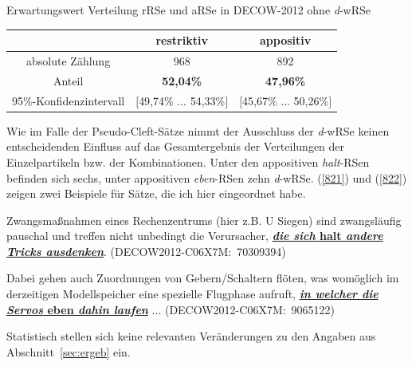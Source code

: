 \begin{exe}
	\ex\label{820}Erwartungswert Verteilung rRSe und aRSe in DECOW-2012 ohne \textit{d}-wRSe\\[-1em]		
 		\begin{tabular}[t]{|c|c|c|} 
 		\hline 	
   	 	& \textbf{restriktiv} & \textbf{appositiv} \\
   	 	\hline 
  		absolute Zählung & 968 & 892\\ 
   		\hline
   		Anteil & \textbf{52,04\%} & \textbf{47,96\%}\\
   		\hline
   		95\%-Konfidenzintervall & $[$49,74\% ... 54,33\%$]$ & $[$45,67\% ... 50,26\%$]$ \\
   		\hline
 		\end{tabular}
\end{exe}
Wie im Falle der Pseudo-Cleft-Sätze nimmt der Ausschluss der \textit{d}-wRSe keinen entscheidenden Einfluss auf das Gesamtergebnis der Verteilungen der Einzelpartikeln bzw. der Kombinationen. Unter den appositiven \textit{halt}-RSen befinden sich sechs, unter appositiven \textit{eben}-RSen zehn \textit{d}-wRSe. (\ref{821}) und (\ref{822}) zeigen zwei Beispiele für Sätze, die ich hier eingeordnet habe.

\begin{exe}
	\ex\label{821} 
	\scriptsize
	Zwangsmaßnahmen eines Rechenzentrums (hier z.B. U Siegen) sind zwangsläufig pauschal und tref\-fen nicht unbedingt die Verursacher, \underline{\textbf{\textit{die sich} halt \textit{andere Tricks ausdenken}}}.                                        
	\newline
	\hbox{}\hfill\hbox{(DECOW2012-C06X7M: 70309394)}
\end{exe} 	

 \begin{exe}
	\ex\label{822} 
	\scriptsize
	Dabei gehen auch Zuordnungen von Gebern/Schaltern flöten, was womöglich im derzeitigen Mo\-dellspeicher eine spezielle Flugphase aufruft, \underline{\textbf{\textit{in welcher die Servos} eben \textit{dahin laufen}}} ... 	 
	\newline
	\hbox{}\hfill\hbox{(DECOW2012-C06X7M: 9065122)}
\end{exe}                                                           				                         
Statistisch stellen sich keine relevanten Veränderungen zu den Angaben aus Abschnitt~\ref{sec:ergeb} ein.

